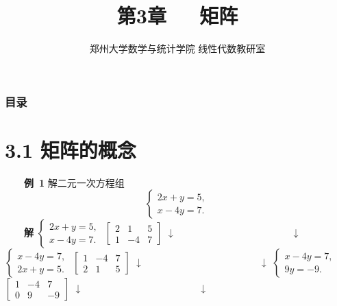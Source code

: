 \documentclass[compress,mathserif,cjk]{beamer}
\title{\textsc{第3章\ \ \ 矩阵}}
\author{郑州大学数学与统计学院 线性代数教研室}
\date{}
\theoremstyle{remark}
\numberwithin{equation}{section}
\newcommand{\hei}{\bf}      %
\begin{document}
\begin{CJK}{UTF8}{gbsn}
\frame{\titlepage}

\begin{frame}\frametitle{目录}
 \tableofcontents
\end{frame}

\section[3.1]{3.1 矩阵的概念}
\begin{frame}
 \ \ \ \ {\hei 例~1} 解二元一次方程组
 $$\left\{\begin{array}{r}
 2x+y=5,\\
 x-4y=7.
 \end{array}\right.$$
 \pause\ \ \ \ {\hei 解}\hspace{2em}
 \small
 $\left\{\begin{array}{r} 2x+y=5,\\ x-4y=7.\end{array}\right.$ \hspace{6em}$\left[\begin{matrix}2&1&5\\1&-4&7\end{matrix}\right]$
 \vskip 2pt\hspace{8em}$\downarrow\hspace{12em}\downarrow$
 \vskip 2pt\hspace{4.5em}
 $\left\{\begin{array}{r}x-4y=7,\\ 2x+y=5.\end{array}\right.$ \hspace{6em}$\left[\begin{matrix}1&-4&7\\ 2&1&5\end{matrix}\right]$
 \vskip 2pt\hspace{8em}$\downarrow\hspace{12em}\downarrow$
 \vskip 2pt\hspace{4.4em}
 $\left\{\begin{array}{r}x-4y=7,\ \ \ \\ 9y=-9.\end{array}\right.$ \hspace{5.3em}$\left[\begin{matrix}1&-4&7\\ 0&9&-9\end{matrix}\right]$
 \vskip 2pt\hspace{8em}$\downarrow\hspace{12em}\downarrow$

\end{frame}
\end{CJK}
\end{document}
